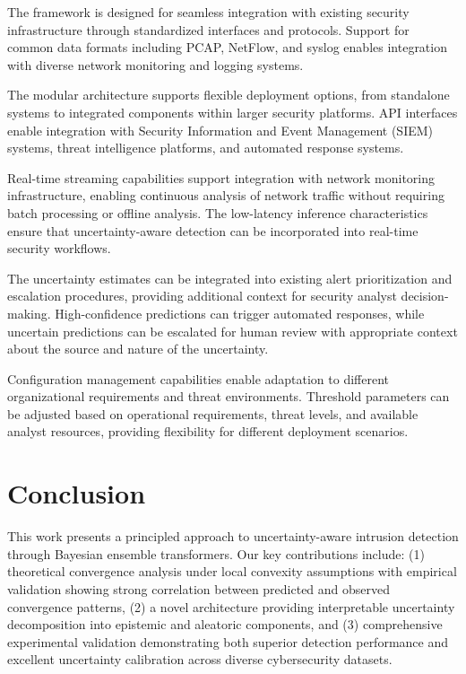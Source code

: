\documentclass[journal]{IEEEtran}
\begin{document}
The framework is designed for seamless integration with existing security infrastructure through standardized interfaces and protocols. Support for common data formats including PCAP, NetFlow, and syslog enables integration with diverse network monitoring and logging systems.

The modular architecture supports flexible deployment options, from standalone systems to integrated components within larger security platforms. API interfaces enable integration with Security Information and Event Management (SIEM) systems, threat intelligence platforms, and automated response systems.

Real-time streaming capabilities support integration with network monitoring infrastructure, enabling continuous analysis of network traffic without requiring batch processing or offline analysis. The low-latency inference characteristics ensure that uncertainty-aware detection can be incorporated into real-time security workflows.

The uncertainty estimates can be integrated into existing alert prioritization and escalation procedures, providing additional context for security analyst decision-making. High-confidence predictions can trigger automated responses, while uncertain predictions can be escalated for human review with appropriate context about the source and nature of the uncertainty.

Configuration management capabilities enable adaptation to different organizational requirements and threat environments. Threshold parameters can be adjusted based on operational requirements, threat levels, and available analyst resources, providing flexibility for different deployment scenarios.

\section{Conclusion}

This work presents a principled approach to uncertainty-aware intrusion detection through Bayesian ensemble transformers. Our key contributions include: (1) theoretical convergence analysis under local convexity assumptions with empirical validation showing strong correlation between predicted and observed convergence patterns, (2) a novel architecture providing interpretable uncertainty decomposition into epistemic and aleatoric components, and (3) comprehensive experimental validation demonstrating both superior detection performance and excellent uncertainty calibration across diverse cybersecurity datasets.
\end{document}
